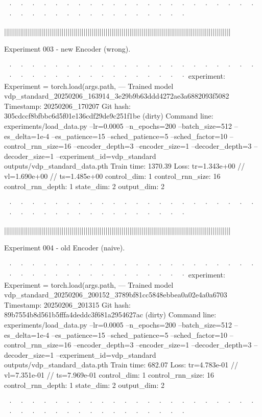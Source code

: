 ~· ~· ~· ~· ~· ~· ~· ~· ~· ~· ~· ~· ~· ~· ~· ~· ~· ~· ~· ~· ~· ~· ~· ~· ~· ~· ~· ~· ~· ~· ~· ~· ~· ~· ~· ~· ~· ~· 



||||||||||||||||||||||||||||||||||||||||||||||||||||||||||||||||||||||||||||||||||||||||||||||||||||||||||||||||||


Experiment 003 - new Encoder (wrong). 	


~· ~· ~· ~· ~· ~· ~· ~· ~· ~· ~· ~· ~· ~· ~· ~· ~· ~· ~· ~· ~· ~· ~· ~· ~· ~· ~· ~· ~· ~· ~· ~· ~· ~· ~· ~· ~· ~· 
  experiment: Experiment = torch.load(args.path,
--- Trained model   vdp_standard_20250206_163914_3e29b9b63ddd4272ae3a6882093f5082
Timestamp:      20250206_170207
Git hash:       305cdccf8bfbbc6d5f01e136cdf29de9c251f1be (dirty)
Command line:   experiments/load_data.py --lr=0.0005 --n_epochs=200 --batch_size=512 --es_delta=1e-4 --es_patience=15 --sched_patience=5 --sched_factor=10 --control_rnn_size=16 --encoder_depth=3 --encoder_size=1 --decoder_depth=3 --decoder_size=1 --experiment_id=vdp_standard outputs/vdp_standard_data.pth
Train time:     1370.39
Loss:           tr=1.343e+00 // vl=1.690e+00 // ts=1.485e+00
control_dim: 1
control_rnn_size: 16
control_rnn_depth: 1
state_dim: 2
output_dim: 2

~· ~· ~· ~· ~· ~· ~· ~· ~· ~· ~· ~· ~· ~· ~· ~· ~· ~· ~· ~· ~· ~· ~· ~· ~· ~· ~· ~· ~· ~· ~· ~· ~· ~· ~· ~· ~· ~· 



||||||||||||||||||||||||||||||||||||||||||||||||||||||||||||||||||||||||||||||||||||||||||||||||||||||||||||||||||


Experiment 004 - old Encoder (naive). 	


~· ~· ~· ~· ~· ~· ~· ~· ~· ~· ~· ~· ~· ~· ~· ~· ~· ~· ~· ~· ~· ~· ~· ~· ~· ~· ~· ~· ~· ~· ~· ~· ~· ~· ~· ~· ~· ~· 
  experiment: Experiment = torch.load(args.path,
--- Trained model   vdp_standard_20250206_200152_3789bf81cc5848ebbea0a02e4a0a6703
Timestamp:      20250206_201315
Git hash:       89b7554b8d561b5fffa4deddc3f681a2954627ac (dirty)
Command line:   experiments/load_data.py --lr=0.0005 --n_epochs=200 --batch_size=512 --es_delta=1e-4 --es_patience=15 --sched_patience=5 --sched_factor=10 --control_rnn_size=16 --encoder_depth=3 --encoder_size=1 --decoder_depth=3 --decoder_size=1 --experiment_id=vdp_standard outputs/vdp_standard_data.pth
Train time:     682.07
Loss:           tr=4.783e-01 // vl=7.351e-01 // ts=7.969e-01
control_dim: 1
control_rnn_size: 16
control_rnn_depth: 1
state_dim: 2
output_dim: 2

~· ~· ~· ~· ~· ~· ~· ~· ~· ~· ~· ~· ~· ~· ~· ~· ~· ~· ~· ~· ~· ~· ~· ~· ~· ~· ~· ~· ~· ~· ~· ~· ~· ~· ~· ~· ~· ~· 



